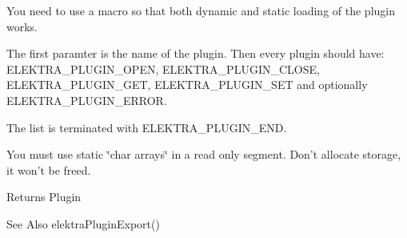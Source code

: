 You need to use a macro so that both dynamic and static loading of the plugin works.

The first paramter is the name of the plugin. Then every plugin should have\-: {\ttfamily E\-L\-E\-K\-T\-R\-A\-\_\-\-P\-L\-U\-G\-I\-N\-\_\-\-O\-P\-E\-N}, {\ttfamily E\-L\-E\-K\-T\-R\-A\-\_\-\-P\-L\-U\-G\-I\-N\-\_\-\-C\-L\-O\-S\-E}, {\ttfamily E\-L\-E\-K\-T\-R\-A\-\_\-\-P\-L\-U\-G\-I\-N\-\_\-\-G\-E\-T}, {\ttfamily E\-L\-E\-K\-T\-R\-A\-\_\-\-P\-L\-U\-G\-I\-N\-\_\-\-S\-E\-T} and optionally {\ttfamily E\-L\-E\-K\-T\-R\-A\-\_\-\-P\-L\-U\-G\-I\-N\-\_\-\-E\-R\-R\-O\-R}.

The list is terminated with {\ttfamily E\-L\-E\-K\-T\-R\-A\-\_\-\-P\-L\-U\-G\-I\-N\-\_\-\-E\-N\-D}.

You must use static \char`\"{}char arrays\char`\"{} in a read only segment. Don't allocate storage, it won't be freed.

\begin{DoxyReturn}{Returns}
Plugin 
\end{DoxyReturn}
\begin{DoxySeeAlso}{See Also}
elektra\-Plugin\-Export() 
\end{DoxySeeAlso}
